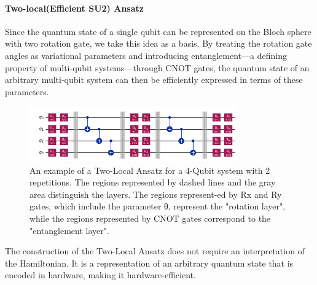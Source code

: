 \documentclass[pdflatex,sn-mathphys-num]{sn-jnl}%
\theoremstyle{thmstyleone}%
\theoremstyle{thmstyletwo}%
\theoremstyle{thmstylethree}%
\begin{document}
\paragraph{Two-local(Efficient SU2) Ansatz} \leavevmode \newline
Since the quantum state of a single qubit can be represented on the Bloch sphere with two rotation gate, we take this idea as a basis. 
By treating the rotation gate angles as variational parameters and introducing entanglement—a defining property of multi-qubit systems—through CNOT gates, 
the quantum state of an arbitrary multi-qubit system can then be efficiently expressed in terms of these parameters.

\begin{figure}[htbp]
\centering
\includegraphics[width=0.8\textwidth]{fig/twolocal.png}
\caption{An example of a Two-Local Ansatz for a 4-Qubit system with 2 repetitions. The regions represented by dashed lines and the gray area distinguish the layers. The regions represent-ed by Rx and Ry gates, which include the parameter θ, represent the "rotation layer", while the regions represented by CNOT gates correspond to the "entanglement layer".}\label{Fig.3}
\end{figure}
The construction of the Two-Local Ansatz does not require an interpretation of the Hamiltonian. It is a representation of an arbitrary quantum state that is encoded in hardware, making it hardware-efficient.
\end{document}
